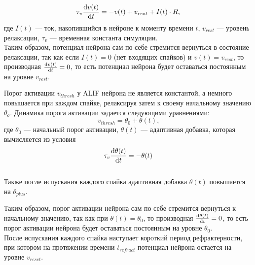 \documentclass[a4paper]{article}
\begin{document}
\begin{equation} \label{eq:alif}
 \tau_v \dv{v(t)}{t} = -v(t) + v_{rest} + I(t) \cdot R \text{,}
\end{equation} где $I(t)$ --- ток, накопившийся в нейроне к моменту времени $t$, $v_{rest}$ --- уровень релаксации, $\tau_v$ --- временная константа симуляции.\\ 

Таким образом, потенциал нейрона сам по себе стремится вернуться в состояние релаксации, так как если $I(t) = 0$ (нет входящих спайков) и $v(t) = v_{rest}$, то производная $\dv{v(t)}{t} = 0$, то есть потенциал нейрона будет оставаться постоянным на уровне $v_{rest}$. 

Порог активации $v_{thresh}$ у ALIF нейрона не является константой, а немного повышается при каждом спайке, релаксируя затем к своему начальному значению $\theta_o$. Динамика порога активации задается следующими уравнениями:
\begin{equation} 
 v_{thresh} = \theta_0 + \theta(t) \text{,}
\end{equation} где $\theta_0$ --- начальный порог активации, $\theta(t)$ --- адаптивная добавка, которая вычисляется из условия\\

\begin{equation}
 \tau_v \dv{\theta(t)}{t} = -\theta(t)
\end{equation}\\

Также после испускания каждого спайка адаптивная добавка $\theta(t)$ повышается на $\theta_{plus}$.

Таким образом, порог активации нейрона сам по себе стремится вернуться к начальному значению, так как при $\theta(t) = \theta_0$, то производная $\dv{\theta(t)}{t} = 0$, то есть порог активации нейрона будет оставаться постоянным на уровне $\theta_0$.\\

После испускания каждого спайка наступает короткий период рефрактерности, при котором на протяжении времени $t_{refract}$ потенциал нейрона остается на уровне $v_{reset}$.
\end{document}
